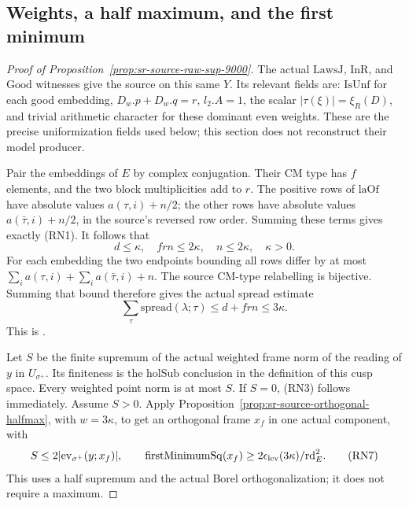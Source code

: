 \subsection{Weights, a half maximum, and the first minimum}
\begin{proof}[Proof of Proposition~\ref{prop:sr-source-raw-sup-9000}]
The actual \(\mathrm{LawsJ}\), \(\mathrm{InR}\), and
\(\mathrm{Good}\) witnesses give the source
 on this same \(Y\).
Its relevant fields are:
\(\mathrm{IsUnf}\) for each good embedding,
\(D_w.p+D_w.q=r\), \(l_2.A=1\), the scalar
\(|\tau(\xi)|=\xi_R(D)\), and trivial arithmetic character
for these dominant even weights.
These are the precise uniformization fields used below; this
section does not reconstruct their model producer.

Pair the embeddings of \(E\) by complex conjugation.
Their CM type has \(f\) elements, and the two block
multiplicities add to \(r\).  The positive rows of
\(\mathrm{laOf}\) have absolute values \(a(\tau,i)+n/2\);
the other rows have absolute values
\(a(\bar\tau,i)+n/2\), in the source's reversed row order.
Summing these terms gives exactly (RN1).
It follows that
\[
 d\le\kappa,\quad frn\le2\kappa,\quad
 n\le2\kappa,\quad \kappa>0.
 \tag{RN5}\label{eq:sr-source-raw-size-inequalities}
\]
For each embedding the two endpoints bounding all rows differ
by at most
\(\sum_i a(\tau,i)+\sum_i a(\bar\tau,i)+n\).
The source CM-type relabelling is bijective.  Summing that bound
therefore gives the actual spread estimate
\[
 \sum_\tau\mathrm{spread}(\lambda;\tau)\le d+frn\le3\kappa .
 \tag{RN6}\label{eq:sr-source-raw-spread}
\]
This is .

Let \(S\) be the finite supremum of the actual weighted frame
norm of the reading of \(y\) in \(U_{\sigma^+}\).
Its finiteness is the \(\mathrm{holSub}\) conclusion in the
definition of this cusp space.
Every weighted point norm is at most \(S\).
If \(S=0\), (RN3) follows immediately.
Assume \(S>0\).
Apply Proposition~\ref{prop:sr-source-orthogonal-halfmax},
with \(w=3\kappa\), to get an orthogonal frame \(x_f\) in one
actual component, with
\[
 S\le2|\mathrm{ev}_{\sigma^+}(y;x_f)|,\qquad
 \mathrm{firstMinimumSq}(x_f)
       \ge2\epsilon_{\rm lev}(3\kappa)/\mathrm{rd}_E^2.
 \tag{RN7}\label{eq:sr-source-raw-halfmax}
\]
This uses a half supremum and the actual Borel
orthogonalization; it does not require a maximum.


\end{proof}
